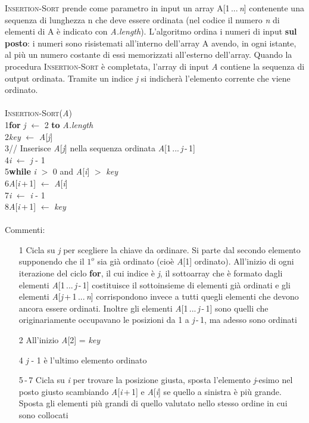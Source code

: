 \documentclass[10pt, a4paper]{report}
\newcommand\firsttab[1][0.5cm]{\hspace*{#1}}
\newcommand\secondtab[1][1cm]{\hspace*{#1}}
\newcommand\thirdtab[1][1.5cm]{\hspace*{#1}}
\begin{document}
\textsc{Insertion-Sort} prende come parametro in input un array A[1\,...\,\textit{n}] contenente una sequenza di lunghezza n che deve essere ordinata (nel codice il numero \textit{n} di elementi di A è indicato con \textit{A.length}). L'algoritmo ordina i numeri di input \textbf{sul posto}: i numeri sono risistemati all'interno dell'array A avendo, in ogni istante, al più un numero costante di essi memorizzati all'esterno dell'array. Quando la procedura \textsc{Insertion-Sort}  è completata, l'array di input \textit{A} contiene la sequenza di output ordinata. Tramite un indice \textit{j} si indicherà l'elemento corrente che viene ordinato.\\\\
\textsc{Insertion-Sort(\textit{A})}\\
1\firsttab \textbf{for} \textit{j}  $\leftarrow$ 2 \textbf{to} \textit{A.length}\\
2\secondtab \textit{key} $\leftarrow$ \textit{A}[\textit{j}]\\
3\secondtab// Inserisce \textit{A}[\textit{j}] nella sequenza ordinata \textit{A}[1\,...\,\textit{j}\,-\,1]\\
4\secondtab \textit{i}  $\leftarrow$ \textit{j}  - 1\\
5\secondtab \textbf{while} \textit{i}  $>$ 0 and \textit{A}[\textit{i}] $>$ \textit{key}\\
6\thirdtab \textit{A}[\textit{i}\,+\,1] $\leftarrow$ \textit{A}[\textit{i}]\\
7\thirdtab \textit{i}  $\leftarrow$ \textit{i}  - 1\\
8\secondtab \textit{A}[\textit{i}\,+\,1] $\leftarrow$ \textit{key}\\\\
Commenti:
\begin{enumerate}
\item[1]Cicla su \textit{j} per scegliere la chiave da ordinare. Si parte dal secondo elemento supponendo che il $1^o$ sia già ordinato (cioè \textit{A}[1] ordinato). All'inizio di ogni iterazione del ciclo \textbf{for}, il cui indice è \textit{j}, il sottoarray che è formato dagli elementi \textit{A}[1\,...\,\textit{j}\,-\,1] costituisce il sottoinsieme di elementi già ordinati e gli elementi \textit{A}[\textit{j}\,+\,1\,...\,\textit{n}] corrispondono invece a tutti quegli elementi che devono ancora essere ordinati. Inoltre gli elementi \textit{A}[1\,...\,\textit{j}\,-\,1] sono quelli che originariamente occupavano le posizioni da 1 a \textit{j}\,-\,1, ma adesso sono ordinati
\item[2]All'inizio \textit{A}[2] = \textit{key}
\item[4]\textit{j} - 1 è l'ultimo elemento ordinato
\item[5\,-\,7]Cicla su \textit{i} per trovare la posizione giusta, sposta l'elemento \textit{j}-esimo nel posto giusto scambiando \textit{A}[\textit{i}\,+\,1] e \textit{A}[\textit{i}] se quello a sinistra è più grande. Sposta gli elementi più grandi di quello valutato nello stesso ordine in cui sono collocati
\end{enumerate}
\end{document}
